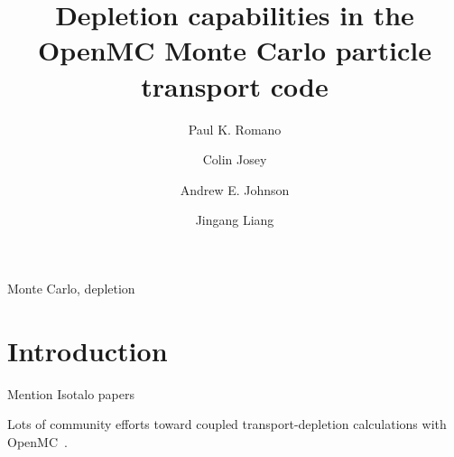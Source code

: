 \documentclass[3p,authoryear]{elsarticle}
\begin{document}
\title{Depletion capabilities in the OpenMC Monte Carlo particle transport code}

\author[anl]{Paul K. Romano}

\author[lanl]{Colin Josey}

\author[gatech]{Andrew E. Johnson}

\author[tsinghua]{Jingang Liang}

\address[anl]{Argonne National Laboratory, 9700 S. Cass Ave, Lemont, IL 60439, United States}
\address[lanl]{Los Alamos National Laboratory, PO Box 1663, Los Alamos, NM 87545, United States}
\address[gatech]{Georgia Institute of Technology, 770 State St NW, Atlanta, GA 30318, United States}
\address[tsinghua]{Institute of Nuclear and New Energy Technology, Tsinghua University, Beijing, China}

\begin{abstract}

\end{abstract}

\begin{keyword}
  Monte Carlo, depletion
\end{keyword}

\maketitle

\section{Introduction}

Mention Isotalo papers

Lots of community efforts toward coupled transport-depletion calculations with
OpenMC~\citep{gul2017ane,lanversin2017icone,lanversin2019phd,liu2019nst,zhuang2020pne,zhao2020ned,zhao2020cpc,zhang2020ane}.
\end{document}
